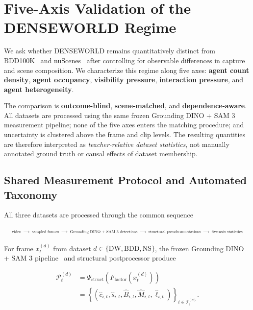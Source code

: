 \section{Five-Axis Validation of the DENSEWORLD Regime}
\label{app:benchmark_validation}

We ask whether DENSEWORLD remains quantitatively distinct from
BDD100K~\cite{yu2020bdd100k} and
nuScenes~\cite{caesar2020nuscenes} after controlling for observable
differences in capture and scene composition. We characterize this
regime along five axes: \textbf{agent count density},
\textbf{agent occupancy}, \textbf{visibility pressure},
\textbf{interaction pressure}, and \textbf{agent heterogeneity}.

The comparison is \textbf{outcome-blind}, \textbf{scene-matched}, and
\textbf{dependence-aware}. All datasets are processed using the same
frozen Grounding DINO + SAM 3 measurement pipeline; none of the five axes enters
the matching procedure; and uncertainty is clustered above the frame
and clip levels. The resulting quantities are therefore interpreted as
\emph{teacher-relative dataset statistics}, not manually annotated
ground truth or causal effects of dataset membership.


\subsection{Shared Measurement Protocol and Automated Taxonomy}
\label{app:shared_taxonomy}

All three datasets are processed through the common sequence

\begin{equation*}
\resizebox{0.98\columnwidth}{!}{$\displaystyle
\text{video}
\;\longrightarrow\;
\text{sampled frames}
\;\longrightarrow\;
\text{Grounding DINO + SAM 3 detections}
\;\longrightarrow\;
\text{structural pseudo-annotations}
\;\longrightarrow\;
\text{five-axis statistics}
$}
\end{equation*}

For frame \(x_t^{(d)}\) from dataset
\(d\in\{\mathrm{DW},\mathrm{BDD},\mathrm{NS}\}\), the frozen Grounding DINO + SAM 3
pipeline~\cite{carion2025sam3} and structural postprocessor produce

\begin{equation*}
\begin{aligned}
\mathcal P_t^{(d)}
&=
\Psi_{\mathrm{struct}}
\left(
F_{\mathrm{factor}}(x_t^{(d)})
\right)
\\
&=
\left\{
\left(
\hat c_{i,t},
\hat s_{i,t},
\hat B_{i,t},
\hat M_{i,t},
\hat\ell_{i,t}
\right)
\right\}_{i\in\mathcal I_t^{(d)}} .
\end{aligned}
\end{equation*}

